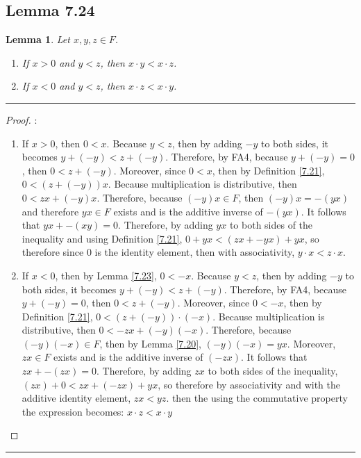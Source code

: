 \documentclass[openany, amssymb, psamsfonts]{amsart}
\newtheorem{lem}{Lemma}[section]
\theoremstyle{definition}
\numberwithin{equation}{section}
\begin{document}
\subsection*{Lemma 7.24}
\begin{lem}
\label{7.24}
	Let $x,y,z \in F$. 
	\begin{enumerate}
		\item If $x > 0$ and $y < z$, then $x \cdot y < x \cdot z$.
		\item If $x < 0$ and $y < z$, then $x \cdot z < x \cdot y$.
	\end{enumerate}
\end{lem}
\vspace{4pt}     \hrule   \vspace{4pt}
\begin{proof}:\\
\begin{enumerate}
    \item If $x>0$, then $0<x$. Because $y<z$, then by adding $-y$ to both sides, it becomes $y+(-y)<z+(-y)$. Therefore, by FA4, because $y+(-y) = 0$, then $0<z+(-y)$. Moreover, since $0<x$, then by Definition \ref{7.21}, $0<(z+(-y))x$. Because multiplication is distributive, then $0< zx + (-y)x$. Therefore, because $(-y)x \in F$, then $(-y)x = -(yx)$ and therefore $yx\in F$ exists and is the additive inverse of $-(yx)$. It follows that $yx+ -(xy) = 0$. Therefore, by adding $yx$ to both sides of the inequality and using Definition \ref{7.21}, $0+ yx < (zx + -yx) + yx$, so therefore since $0$ is the identity element, then with associativity, $y\cdot x < z\cdot x$.
    \item If $x<0$, then by Lemma \ref{7.23}, $0<-x$. Because $y<z$, then by adding $-y$ to both sides, it becomes $y+(-y)<z+(-y)$. Therefore, by FA4, because $y+(-y) = 0$, then $0<z+(-y)$. Moreover, since $0<-x$, then by Definition \ref{7.21}, $0<(z+(-y))\cdot (-x)$. Because multiplication is distributive, then $0<-zx+(-y)(-x)$. Therefore, because $(-y)(-x) \in F$, then by Lemma \ref{7.20}, $(-y)(-x) = yx$. Moreover, $zx\in F$ exists and is the additive inverse of $(-zx)$. It follows that $zx+ -(zx) = 0$. Therefore, by adding $zx$ to both sides of the inequality, $(zx)+0<zx+(-zx)+yx$, so therefore by associativity and with the additive identity element, $zx <yz$. then the using the commutative property the expression becomes: $x\cdot z < x\cdot y$ 
\end{enumerate}
 \end{proof}
\vspace{4pt}     \hrule   \vspace{4pt}
\end{document}
